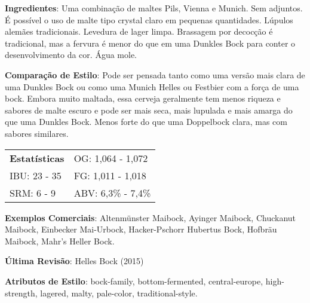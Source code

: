 \textbf{Ingredientes}: Uma combinação de maltes Pils, Vienna e Munich. Sem adjuntos. É possível o uso de malte tipo crystal claro em pequenas quantidades. Lúpulos alemães tradicionais. Levedura de lager limpa. Brassagem por decocção é tradicional, mas a fervura é menor do que em uma Dunkles Bock para conter o desenvolvimento da cor. Água mole.

\textbf{Comparação de Estilo}: Pode ser pensada tanto como uma versão mais clara de uma Dunkles Bock ou como uma Munich Helles ou Festbier com a força de uma bock. Embora muito maltada, essa cerveja geralmente tem menos riqueza e sabores de malte escuro e pode ser mais seca, mais lupulada e mais amarga do que uma Dunkles Bock. Menos forte do que uma Doppelbock clara, mas com sabores similares.

\begin{tabular}{@{}p{35mm}p{35mm}@{}}
  \textbf{Estatísticas} & OG: 1,064 - 1,072 \\
  IBU: 23 - 35  & FG: 1,011 - 1,018  \\
  SRM: 6 - 9  & ABV: 6,3\% - 7,4\%
\end{tabular}

\textbf{Exemplos Comerciais}: Altenmünster Maibock, Ayinger Maibock, Chuckanut Maibock, Einbecker Mai-Urbock, Hacker-Pschorr Hubertus Bock, Hofbräu Maibock, Mahr’s Heller Bock.

\textbf{Última Revisão}: Helles Bock (2015)

\textbf{Atributos de Estilo}: bock-family, bottom-fermented, central-europe, high-strength, lagered, malty, pale-color, traditional-style.
